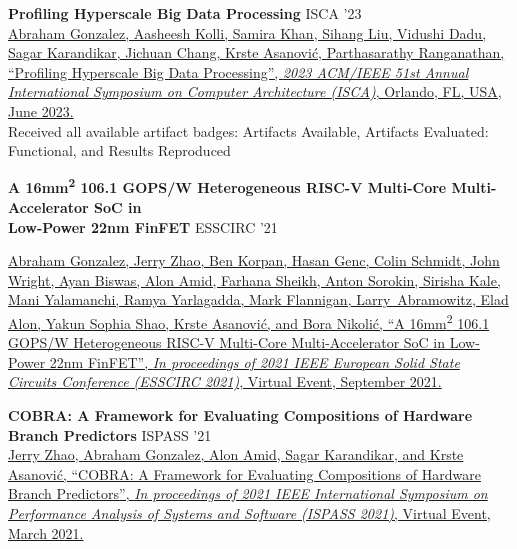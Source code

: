 \documentclass[line]{res}
\begin{document}
\begin{resume}
\label{sec:iscapaper}
\textbf{Profiling Hyperscale Big Data Processing} \hfill ISCA '23
\vspace{0.7mm}
\\
\href{https://dl.acm.org/doi/10.1145/3579371.3589082}{\underline{Abraham Gonzalez}, Aasheesh Kolli, Samira Khan, Sihang Liu, Vidushi Dadu, Sagar Karandikar, Jichuan Chang, Krste Asanovi\'c, Parthasarathy Ranganathan, ``Profiling Hyperscale Big Data Processing'', \textit{2023 ACM/IEEE 51st Annual International Symposium on Computer Architecture (ISCA)}, Orlando, FL, USA, June 2023.}
\\
Received all available artifact badges: Artifacts Available, Artifacts Evaluated: Functional, and Results Reproduced
\vspace{-0.8mm}

\label{sec:beaglepaper}
\textbf{A 16mm\textsuperscript{2} 106.1 GOPS/W Heterogeneous RISC-V Multi-Core Multi-Accelerator SoC in\\Low-Power 22nm FinFET} \hfill ESSCIRC '21
\vspace{0.7mm}
\\
{\raggedright
\href{https://ieeexplore.ieee.org/abstract/document/9567768}{\underline{Abraham Gonzalez}, Jerry Zhao, Ben Korpan, Hasan Genc, Colin Schmidt, John Wright, Ayan Biswas, Alon Amid, Farhana Sheikh, Anton Sorokin, Sirisha Kale, Mani Yalamanchi, Ramya Yarlagadda, Mark Flannigan, Larry~Abramowitz, Elad Alon, Yakun Sophia Shao, Krste Asanovi\'c, and Bora Nikoli\'c, ``A 16mm\textsuperscript{2} 106.1 GOPS/W Heterogeneous RISC-V Multi-Core Multi-Accelerator SoC in Low-Power 22nm FinFET'', \textit{In proceedings of 2021 IEEE European Solid State Circuits Conference (ESSCIRC 2021)}, Virtual Event, September 2021.}
\par}
\vspace{-0.8mm}

\textbf{COBRA: A Framework for Evaluating Compositions of Hardware Branch Predictors} \hfill ISPASS '21
\vspace{0.7mm}
\\
\href{https://ieeexplore.ieee.org/document/9408173}{Jerry Zhao, \underline{Abraham Gonzalez}, Alon Amid, Sagar Karandikar, and Krste Asanovi\'c, ``COBRA: A Framework for Evaluating Compositions of Hardware Branch Predictors'', \textit{In proceedings of 2021 IEEE International Symposium on Performance Analysis of Systems and Software (ISPASS 2021)}, Virtual Event, March 2021.}
\vspace{-0.8mm}


\end{resume}
\end{document}
